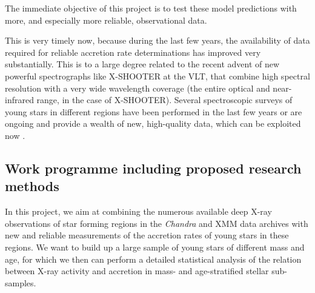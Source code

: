 \documentclass[10pt,fleqn,twoside]{article}
\begin{document}
\begin{highlight}
The immediate objective of this project is to test these model predictions with more, and especially
more reliable, observational data.
\end{highlight}
%

This is very timely now, because during the last few years,
the availability of data required for
reliable accretion rate determinations  has improved very substantially.
This is to a large degree related to
the recent advent of new powerful spectrographs like
X-SHOOTER at the VLT, that combine high spectral resolution
with a very wide wavelength coverage (the entire optical and
near-infrared range, in the case of X-SHOOTER).
Several spectroscopic surveys of young stars in different regions
have been performed in the last few years or are ongoing and provide a wealth
of new, high-quality data, which can be exploited now
\citep[see][]{MT14}.







\subsection{Work programme including proposed research methods}





In this project, we aim at combining the numerous available deep
X-ray observations of star forming regions in the \textit{Chandra} 
and XMM data
archives with new and reliable measurements of the accretion 
rates of young stars in these regions.
We want to build up a large sample of young stars of different mass
and  age,
for which we then can perform a detailed statistical analysis
of the relation between X-ray activity and accretion in mass- 
and age-stratified stellar sub-samples. 
\end{document}
